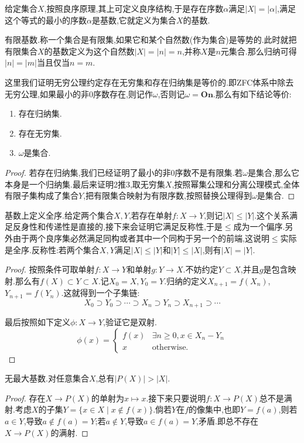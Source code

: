 给定集合$X$,按照良序原理,其上可定义良序结构,于是存在序数$\alpha$满足$|X|=|\alpha|$,满足这个等式的最小的序数$\alpha$是基数,它就定义为集合$X$的基数.

有限基数.称一个集合是有限集,如果它和某个自然数(作为集合)是等势的.此时就把有限集合$X$的基数定义为这个自然数$|X|=|n|=n$,并称$X$是$n$元集合.那么归纳可得$|n|=|m|$当且仅当$n=m$.

这里我们证明无穷公理约定存在无穷集和存在归纳集是等价的.即ZFC体系中除去无穷公理,如果最小的非0序数存在,则记作$\omega$,否则记$\omega=\textbf{On}$.那么有如下结论等价:
\begin{enumerate}
	\item 存在归纳集.
	\item 存在无穷集.
	\item $\omega$是集合.
\end{enumerate}
\begin{proof}
	
	若存在归纳集,我们已经证明了最小的非0序数不是有限集.若$\omega$是集合,那么它本身是一个归纳集.最后来证明2推3,取无穷集$X$,按照幂集公理和分离公理模式,全体有限子集构成了集合$Y$,把有限集合映射为有限序数,按照替换公理得到$\omega$是集合.
\end{proof}

基数上定义全序.给定两个集合$X,Y$,若存在单射$f:X\to Y$,则记$|X|\le|Y|$.这个关系满足反身性和传递性是直接的,接下来会证明它满足反称性,于是$\le$成为一个偏序.另外由于两个良序集必然满足同构或者其中一个同构于另一个的前端,这说明$\le$实际是全序.反称性:若两个集合$X,Y$满足$|X|\le|Y|$和$|Y|\le|X|$,则有$|X|=|Y|$.
\begin{proof}
	
	按照条件可取单射$f:X\to Y$和单射$g:Y\to X$.不妨约定$Y\subset X$,并且$g$是包含映射.那么有$f(X)\subset Y\subset X$.记$X_0=X,Y_0=Y$.归纳的定义$X_{n+1}=f(X_n)$,$Y_{n+1}=f(Y_n)$.这就得到一个子集链:$$X_0\supset Y_0\supset\cdots\supset X_n\supset Y_n\supset X_{n+1}\supset\cdots$$
	
	最后按照如下定义$\phi:X\to Y$,验证它是双射.
	$$\phi(x)=\left\{\begin{array}{cc}
	f(x)&\exists n\ge0,x\in X_n-Y_n\\
	x& \mathrm{otherwise}.
	\end{array}\right.$$
\end{proof}

无最大基数.对任意集合$X$,总有$|P(X)|>|X|$.
\begin{proof}
	
	存在$X\to P(X)$的单射为$x\mapsto{x}$.接下来只要说明$f:X\to P(X)$总不是满射.考虑$X$的子集$Y=\{x\in X\mid x\not\in f(x)\}$.倘若$Y$在$f$的像集中,也即$Y=f(a)$,则若$a\in Y$,导致$a\not\in f(a)=Y$;若$a\not\in Y$,导致$a\in f(a)=Y$,矛盾.即总不存在$X\to P(X)$的满射.
\end{proof}

